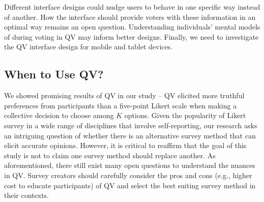 Different interface designs could nudge users to behave in one specific way instead of another. How the interface should provide voters with these information in an optimal way remains an open question. Understanding individuals' mental models of during voting in QV may inform better designs. Finally, we need to investigate the QV interface design for mobile and tablet devices.

\subsection{When to Use QV?}
We showed promising results of QV in our study -- QV elicited more truthful preferences from participants than a five-point Likert scale when making a collective decision to choose among $K$ options. Given the popularity of Likert survey in a wide range of disciplines that involve self-reporting, our research asks an intriguing question of whether there is an alternative survey method that can elicit accurate opinions. However, it is critical to reaffirm that the goal of this study is not to claim one survey method should replace another. As aforementioned, there still exist many open questions to understand the nuances in QV. Survey creators should carefully consider the pros and cons (e.g., higher cost to educate participants) of QV and select the best suiting survey method in their contexts.





